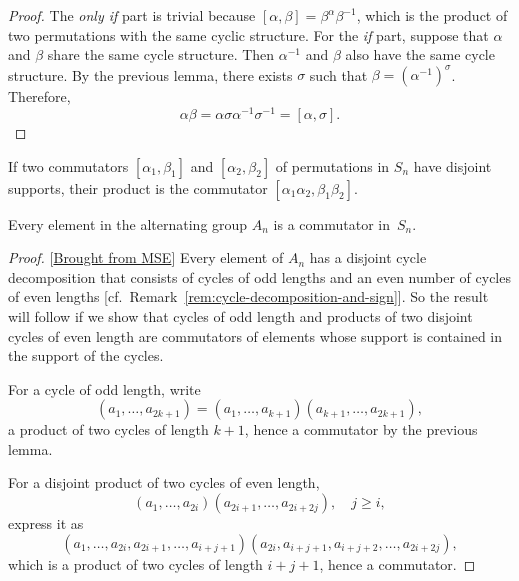 \begin{proof} The \textit{only if\/} part is trivial because $[\alpha,\beta]=\beta^\alpha\beta^{-1}$, which is the product of two permutations with the same cyclic structure. For the \textit{if\/} part, suppose that $\alpha$ and $\beta$ share the same cycle structure. Then $\alpha^{-1}$ and $\beta$ also have the same cycle structure. By the previous lemma, there exists $\sigma$ such that $\beta=(\alpha^{-1})^\sigma$. Therefore, 
$$
    \alpha\beta = \alpha\sigma\alpha^{-1}\sigma^{-1}=[\alpha,\sigma].
$$
\end{proof}

\begin{rem}
    If two commutators\/ $[\alpha_1,\beta_1]$ and\/ $[\alpha_2,\beta_2]$ of permutations in\/ $S_n$ have disjoint supports, their product is the commutator\/ $[\alpha_1\alpha_2,\beta_1\beta_2]$.
\end{rem}


\begin{thm}
    Every element in the alternating group\/ $A_n$ is a commutator in\/~$S_n$.
\end{thm}

\begin{proof} {[\href{https://math.stackexchange.com/a/4825323/269050}{Brought from MSE}]} Every element of $A_n$ has a disjoint cycle decomposition that consists of cycles of odd lengths and an even number of cycles of even lengths [cf.~Remark~\ref{rem:cycle-decomposition-and-sign}]. So the result will follow if we show that cycles of odd length and products of two disjoint cycles of even length are commutators of elements whose support is contained in the support of the cycles.

For a cycle of odd length, write
$$
    (a_1,\dots,a_{2k+1}) = (a_1,\ldots,a_{k+1})(a_{k+1},\ldots,a_{2k+1}),
$$
a product of two cycles of length $k+1$, hence a commutator by the previous lemma.

For a disjoint product of two cycles of even length,
$$
    (a_1,\dots,a_{2i})(a_{2i+1},\dots,a_{2i+2j}),\quad j\ge i,
$$
express it as
$$
    (a_1,\dots,a_{2i},a_{2i+1},\dots,a_{i+j+1})(a_{2i},a_{i+j+1},a_{i+j+2},\dots,a_{2i+2j}),
$$
which is a product of two cycles of length $i+j+1$, hence a commutator.

\end{proof}

